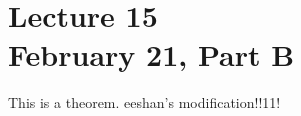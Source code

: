 \chapter*{Lecture 15 \\ February 21, Part B}
\setcounter{chapter}{15}
\setcounter{section}{0}

\begin{thm}
	This is a theorem. eeshan's modification!!11!
\end{thm}
